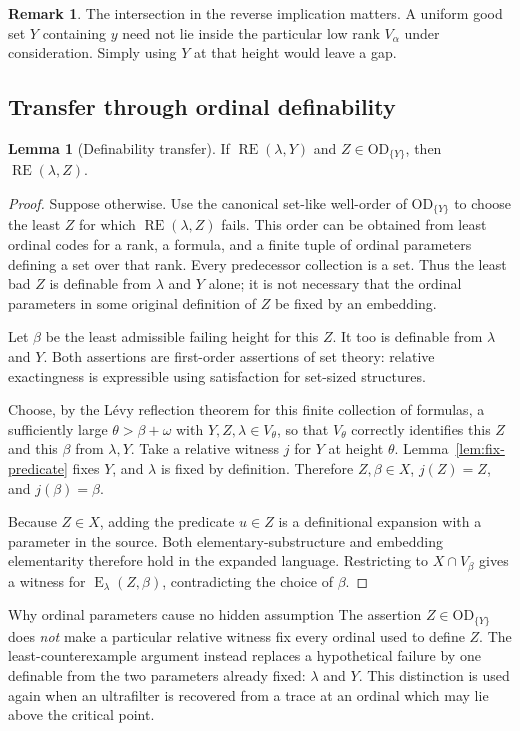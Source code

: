 \documentclass[11pt,letterpaper]{article}
\theoremstyle{definition}
\newtheorem{lemma}[definition]{Lemma}
\newcommand{\OD}{\mathrm{OD}}
\newcommand{\RE}{\operatorname{RE}}
\newcommand{\Erel}{\operatorname{E}}
\newtheorem{remark}[definition]{Remark}
\begin{document}
\begin{remark}
The intersection in the reverse implication matters. A uniform good set $Y$ containing $y$ need not lie inside the particular low rank $V_\alpha$ under consideration. Simply using $Y$ at that height would leave a gap.
\end{remark}

\subsection{Transfer through ordinal definability}

\begin{lemma}[Definability transfer]\label{lem:transfer}
If $\RE(\lambda,Y)$ and $Z\in\OD_{\{Y\}}$, then $\RE(\lambda,Z)$.
\end{lemma}
\begin{proof}
Suppose otherwise. Use the canonical set-like well-order of $\OD_{\{Y\}}$ to choose the least $Z$ for which $\RE(\lambda,Z)$ fails. This order can be obtained from least ordinal codes for a rank, a formula, and a finite tuple of ordinal parameters defining a set over that rank. Every predecessor collection is a set. Thus the least bad $Z$ is definable from $\lambda$ and $Y$ alone; it is not necessary that the ordinal parameters in some original definition of $Z$ be fixed by an embedding.

Let $\beta$ be the least admissible failing height for this $Z$. It too is definable from $\lambda$ and $Y$. Both assertions are first-order assertions of set theory: relative exactingness is expressible using satisfaction for set-sized structures.

Choose, by the L\'evy reflection theorem for this finite collection of formulas, a sufficiently large $\theta>\beta+\omega$ with $Y,Z,\lambda\in V_\theta$, so that $V_\theta$ correctly identifies this $Z$ and this $\beta$ from $\lambda,Y$. Take a relative witness $j$ for $Y$ at height $\theta$. Lemma~\ref{lem:fix-predicate} fixes $Y$, and $\lambda$ is fixed by definition. Therefore $Z,\beta\in X$, $j(Z)=Z$, and $j(\beta)=\beta$.

Because $Z\in X$, adding the predicate $u\in Z$ is a definitional expansion with a parameter in the source. Both elementary-substructure and embedding elementarity therefore hold in the expanded language. Restricting to $X\cap V_\beta$ gives a witness for $\Erel_\lambda(Z,\beta)$, contradicting the choice of $\beta$.
\end{proof}

\begin{assessment}{Why ordinal parameters cause no hidden assumption}
The assertion $Z\in\OD_{\{Y\}}$ does \emph{not} make a particular relative witness fix every ordinal used to define $Z$. The least-counterexample argument instead replaces a hypothetical failure by one definable from the two parameters already fixed: $\lambda$ and $Y$. This distinction is used again when an ultrafilter is recovered from a trace at an ordinal which may lie above the critical point.
\end{assessment}
\end{document}
